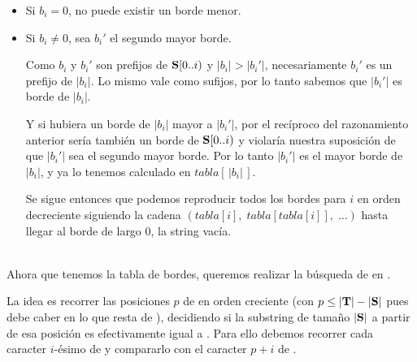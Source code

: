 \begin{itemize}
    \item Si $b_i = 0$, no puede existir un borde menor.
    \item Si $b_i \neq 0$, sea $b_i'$ el segundo mayor borde.

        Como $b_i$ y $b_i'$ son prefijos de $\textbf{S}[0..i)$ y $|b_i| > |b_i'|$, necesariamente $b_i'$ es un prefijo de $|b_i|$. Lo mismo vale como sufijos, por lo tanto sabemos que $|b_i'|$ es borde de $|b_i|$.

        Y si hubiera un borde de $|b_i|$ mayor a $|b_i'|$, por el recíproco del razonamiento anterior sería también un borde de $\textbf{S}[0..i)$ y violaría nuestra suposición de que $|b_i'|$ sea el segundo mayor borde. Por lo tanto $|b_i'|$ es el mayor borde de $|b_i|$, y ya lo tenemos calculado en $tabla[ \,|b_i|\, ]$.

        Se sigue entonces que podemos reproducir todos los bordes para $i$ en orden decreciente siguiendo la cadena $(tabla[i], \; tabla[tabla[i]], \; \ldots)$ hasta llegar al borde de largo 0, la string vacía.

\end{itemize}
\\

Ahora que tenemos la tabla de bordes, queremos realizar la búsqueda de \sS en \sT.

La idea es recorrer las posiciones $p$ de \sT en orden creciente (con $p \leq |\textbf{T}| - |\textbf{S}|$ pues \sS debe caber en lo que resta de \sT), decidiendo si la substring de tamaño $|\textbf{S}|$ a partir de esa posición es efectivamente igual a \sS. Para ello debemos recorrer cada caracter $i$-ésimo de \sS y compararlo con el caracter $p+i$ de \sT.

